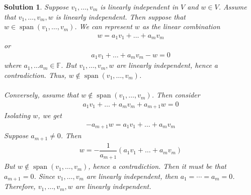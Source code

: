 \documentclass[12pt]{article}
\newcommand{\F}{\mathbb{F}}
\DeclareMathOperator{\spn}{span}
\theoremstyle{problem}
\newtheorem{sol}{Solution}
\theoremstyle{remark}
\begin{document}
\begin{sol}
    Suppose $v_1,\ldots,v_m $ is linearly independent in $V$ and $w \in V$. Assume that $v_1, \ldots,v_m,w$ is linearly independent. Then suppose that $w \in \spn(v_1,\ldots,v_m)$. We can represent $w$ as the linear combination
    \begin{align*}
        w = a_1v_1 + \ldots+a_mv_m
    \end{align*}
    or
    \begin{align*}
        a_1v_1 +\ldots+a_mv_m -w = 0
    \end{align*}
    where $a_1,\ldots a_m \in \F$. But $v_1,\ldots,v_m,w$ are linearly independent, hence a contradiction. Thus, $w \not \in \spn(v_1,\ldots,v_m)$. \\ \\
    Conversely, assume that $w \not\in \spn(v_1,\ldots,v_m)$. Then consider 
    \begin{align*}
        a_1v_1 + \ldots + a_mv_m + a_{m+1}w = 0
    \end{align*}
    Isolating $w$, we get 
    \begin{align*}
        -a_{m+1} w = a_1v_1 + \ldots + a_mv_m
    \end{align*}
    Suppose $a_{m+1} \neq 0$. Then
    \begin{align*}
        w = -\dfrac{1}{a_{m+1}}(a_1v_1 + \ldots+a_mv_m)
    \end{align*}
    But $w \not \in \spn(v_1,\ldots,v_m)$, hence a contradiction. Then it must be that $a_{m+1} = 0$. Since $v_1, \ldots,v_m$ are linearly independent, then $a_1 = \cdots =a_m=0$. Therefore, $v_1,\ldots,v_m,w$ are linearly independent.

\end{sol}
\end{document}
